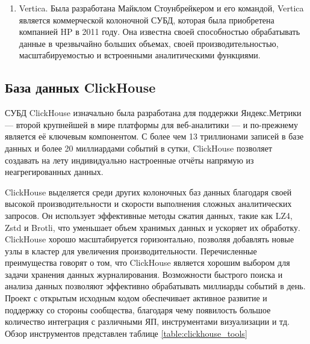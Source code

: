 \documentclass[14pt, russian]{scrartcl}
\begin{document}
\begin{enumerate}
	\item{Vertica. Была разработана Майклом Стоунбрейкером и его командой, Vertica является коммерческой колоночной СУБД, которая была приобретена компанией HP в 2011 году. Она известна своей способностью обрабатывать данные в чрезвычайно больших объемах, своей производительностью, масштабируемостью и встроенными аналитическими функциями.}
\end{enumerate}


\subsection{База данных ClickHouse}

СУБД ClickHouse \cite{ClickDocs} изначально была разработана для поддержки Яндекс.Метрики
--- второй крупнейшей в мире платформы для веб-аналитики — и по-прежнему является её ключевым компонентом.
С более чем 13 триллионами записей в базе данных и более 20 миллиардами событий в сутки,
ClickHouse позволяет создавать на лету индивидуально настроенные отчёты напрямую из неагрегированных данных.

ClickHouse выделяется среди других колоночных баз данных благодаря своей высокой производительности
и скорости выполнения сложных аналитических запросов.
Он использует эффективные методы сжатия данных, такие как LZ4, Zstd и Brotli,
что уменьшает объем хранимых данных и ускоряет их обработку.
ClickHouse хорошо масштабируется горизонтально, позволяя добавлять
новые узлы в кластер для увеличения производительности.
Перечисленные преимущества говорят о том, что ClickHouse является
хорошим выбором для задачи хранения данных журналирования. Возможности быстрого поиска
и анализа данных позволяют эффективно обрабатывать миллиарды событий в день.
Проект с открытым исходным кодом обеспечивает активное развитие и поддержку
со стороны сообщества, благодаря чему появилость большое количество интеграция
с различными ЯП, инструментами визуализации и тд. Обзор инструментов представлен таблице \ref{table:clickhouse_tools}
\end{document}

